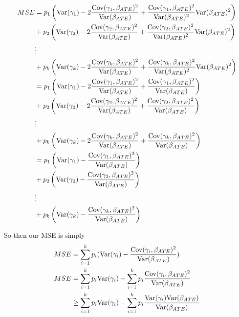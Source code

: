\begin{align*}
	MSE
	&=  p_1 \left(\mathrm{Var}(\gamma_1) - 2\frac{\mathrm{Cov}(\gamma_1, \beta_{ATE})^2}{\mathrm{Var}(\beta_{ATE})} + \frac{\mathrm{Cov}(\gamma_1, \beta_{ATE})^2}{\mathrm{Var}(\beta_{ATE})^2} \mathrm{Var}(\beta_{ATE})^2 \right) \\
	& + p_2 \left(\mathrm{Var}(\gamma_2) - 2\frac{\mathrm{Cov}(\gamma_2, \beta_{ATE})^2}{\mathrm{Var}(\beta_{ATE})} + \frac{\mathrm{Cov}(\gamma_2, \beta_{ATE})^2}{\mathrm{Var}(\beta_{ATE})^2} \mathrm{Var}(\beta_{ATE})^2 \right) \\
	&\vdots \\
	&+ p_k  \left(\mathrm{Var}(\gamma_k) - 2\frac{\mathrm{Cov}(\gamma_k, \beta_{ATE})^2}{\mathrm{Var}(\beta_{ATE})}+ \frac{\mathrm{Cov}(\gamma_k, \beta_{ATE})^2}{\mathrm{Var}(\beta_{ATE})^2} \mathrm{Var}(\beta_{ATE})^2 \right) \\
	&=  p_1 \left(\mathrm{Var}(\gamma_1) - 2\frac{\mathrm{Cov}(\gamma_1, \beta_{ATE})^2}{\mathrm{Var}(\beta_{ATE})} + \frac{\mathrm{Cov}(\gamma_1, \beta_{ATE})^2}{\mathrm{Var}(\beta_{ATE})}  \right) \\
	& + p_2 \left(\mathrm{Var}(\gamma_2) - 2\frac{\mathrm{Cov}(\gamma_2, \beta_{ATE})^2}{\mathrm{Var}(\beta_{ATE})} + \frac{\mathrm{Cov}(\gamma_2, \beta_{ATE})^2}{\mathrm{Var}(\beta_{ATE})} \right) \\
	&\vdots \\
	&+ p_k  \left(\mathrm{Var}(\gamma_k) - 2\frac{\mathrm{Cov}(\gamma_k, \beta_{ATE})^2}{\mathrm{Var}(\beta_{ATE})}+ \frac{\mathrm{Cov}(\gamma_k, \beta_{ATE})^2}{\mathrm{Var}(\beta_{ATE})}  \right) \\
	&=  p_1 \left(\mathrm{Var}(\gamma_1) - \frac{\mathrm{Cov}(\gamma_1, \beta_{ATE})^2}{\mathrm{Var}(\beta_{ATE})}  \right) \\
	& + p_2 \left(\mathrm{Var}(\gamma_2) - \frac{\mathrm{Cov}(\gamma_2, \beta_{ATE})^2}{\mathrm{Var}(\beta_{ATE})} \right) \\
	&\vdots \\
	&+ p_k  \left(\mathrm{Var}(\gamma_k) - \frac{\mathrm{Cov}(\gamma_k, \beta_{ATE})^2}{\mathrm{Var}(\beta_{ATE})} \right) \\
\end{align*}


So then our MSE is simply
\begin{align*}
	MSE &= \sum_{i=1}^{k} p_i (\mathrm{Var}(\gamma_i)  - \frac{\mathrm{Cov}(\gamma_i, \beta_{ATE})^2}{\mathrm{Var}(\beta_{ATE})})  \\
	MSE &= \sum_{i=1}^{k} p_i \mathrm{Var}(\gamma_i) 
	- \sum_{i=1}^{k} p_i \frac{\mathrm{Cov}(\gamma_i, \beta_{ATE})^2}{\mathrm{Var}(\beta_{ATE})} \\
		&\geq \sum_{i=1}^{k} p_i \mathrm{Var}(\gamma_i) 
	- \sum_{i=1}^{k} p_i \frac{\mathrm{Var}(\gamma_i)\mathrm{Var}( \beta_{ATE})}{\mathrm{Var}(\beta_{ATE})} \\
\end{align*} 

